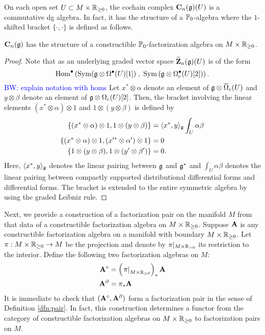 \documentclass[11pt]{amsart}
\numberwithin{equation}{section}
\def\brian{\textcolor{blue}{BW: }\textcolor{blue}}
\begin{document}
On each open set $U \subset M \times \mathbb R_{\geq 0}$, the cochain complex $\mathbf C_n(\mathfrak g) (U)$ is a commutative dg algebra. 
In fact, it has the structure of a $\mathbb P_0$-algebra where the $1$-shifted bracket $\{\cdot, \cdot\}$ is defined as follows.

\begin{lmm}
$\mathbf C_n(\mathfrak g)$ has the structure of a constructible $\mathbb P_0$-factorization algebra on $M \times \mathbb R_{\geq 0}$. 
\end{lmm}

\begin{proof}
Note that as an underlying graded vector space $\widetilde{\mathbf Z}_n(\mathfrak g) (U)$ is of the form
\[
{\rm Hom}^\bullet\left({\rm Sym}(\mathfrak g \otimes \Omega^\bullet (U)[1]) \; , \; {\rm Sym}  \left(\mathfrak g \otimes \Omega^\bullet_c(U) [2] \right) \right)  .
\]
\brian{explain notation with homs} 
Let $x^* \otimes \alpha$ denote an element of $\mathfrak g \otimes \overline{\Omega}_c (U)$ and $y \otimes \beta$ denote an element of $\mathfrak g \otimes \Omega_c(U) [2]$. 
Then, the bracket involving the linear elements $(x^* \otimes \alpha) \otimes 1$ 
and $1 \otimes (y \otimes \beta)$ is defined by
\begin{align*}
\{(x^* \otimes \alpha) \otimes 1 , 1 \otimes (y \otimes \beta)\} & = \langle x^*, y\rangle_\mathfrak g \int_U \alpha \beta \\
\{(x^* \otimes \alpha) \otimes 1 , (x'^* \otimes \alpha') \otimes 1\} & = 0 \\
\{1 \otimes (y \otimes \beta) , 1 \otimes (y' \otimes \beta')\} & = 0 . 
\end{align*}
Here, $\langle x^*, y\rangle_\mathfrak g$ denotes the linear pairing between $\mathfrak g$ and $\mathfrak g^*$ and $\int_U\alpha \beta$ denotes the linear pairing between compactly supported distributional differential forms and differential forms. 
The bracket is extended to the entire symmetric algebra by using the graded Leibniz rule.
\end{proof}

Next, we provide a construction of a factorization pair on the manifold $M$ from that data of a constructible factorization algebra on $M \times \mathbb R_{\geq 0}$. 
Suppose $\mathbf A$ is any constructible factorization algebra on a manifold with boundary $M \times \mathbb R_{\geq 0}$. 
Let $\pi : M \times \mathbb R_{\geq 0} \to M$ be the projection and denote by $\pi|_{M \times \mathbb R_{>0}}$ its restriction to the interior. 
Define the following two factorization algebras on $M$:
\begin{align*}
\mathbf A^\circ & = \left(\left.\pi\right|_{M \times \mathbb R_{>0}} \right)_* \mathbf A \\
\mathbf A^\partial & = \pi_* \mathbf A
\end{align*}
It is immediate to check that $(\mathbf A^\circ, \mathbf A^\partial)$ form a factorization pair in the sense of Definition \ref{dfn:pair}. 
In fact, this construction determines a functor from the category of constructible factorization algebras on $M \times \mathbb R_{\geq 0}$ to factorization pairs on $M$.
\end{document}
